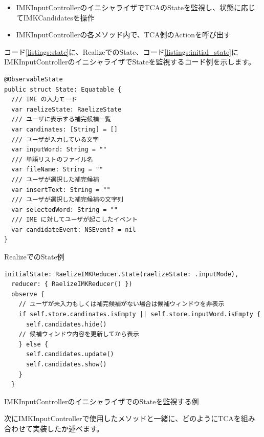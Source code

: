 \documentclass[uplatex,a4j,12pt,twocolumn]{jsarticle}
\begin{document}
\begin{itemize}
  \item IMKInputControllerのイニシャライザでTCAのStateを監視し、状態に応じてIMKCandidatesを操作
  \item IMKInputControllerの各メソッド内で、TCA側のActionを呼び出す
\end{itemize}
コード\ref{listings:state}に、RealizeでのState、コード\ref{listings:initial_state}にIMKInputControllerのイニシャライザでStateを監視するコード例を示します。

\begin{listing}[h]
  \begin{verbatim}
@ObservableState
public struct State: Equatable {
  /// IME の入力モード
  var raelizeState: RaelizeState
  /// ユーザに表示する補完候補一覧
  var candinates: [String] = []
  /// ユーザが入力している文字
  var inputWord: String = ""
  /// 単語リストのファイル名
  var fileName: String = ""
  /// ユーザが選択した補完候補
  var insertText: String = ""
  /// ユーザが選択した補完候補の文字列
  var selectedWord: String = ""
  /// IME に対してユーザが起こしたイベント
  var candidateEvent: NSEvent? = nil
}
  \end{verbatim}
  \caption{RealizeでのState例}\label{listings:state}
\end{listing}

\begin{listing}[h]
  \begin{verbatim}
initialState: RaelizeIMKReducer.State(raelizeState: .inputMode),
  reducer: { RaelizeIMKReducer() })
  observe {
    // ユーザが未入力もしくは補完候補がない場合は候補ウィンドウを非表示
    if self.store.candinates.isEmpty || self.store.inputWord.isEmpty {
      self.candidates.hide()
    // 候補ウィンドウ内容を更新してから表示
    } else {
      self.candidates.update()
      self.candidates.show()
    }
  }
  \end{verbatim}
  \caption{IMKInputControllerのイニシャライザでのStateを監視する例}\label{listings:initial_state}
\end{listing}
次にIMKInputControllerで使用したメソッドと一緒に、どのようにTCAを組み合わせて実装したか述べます。
\end{document}
